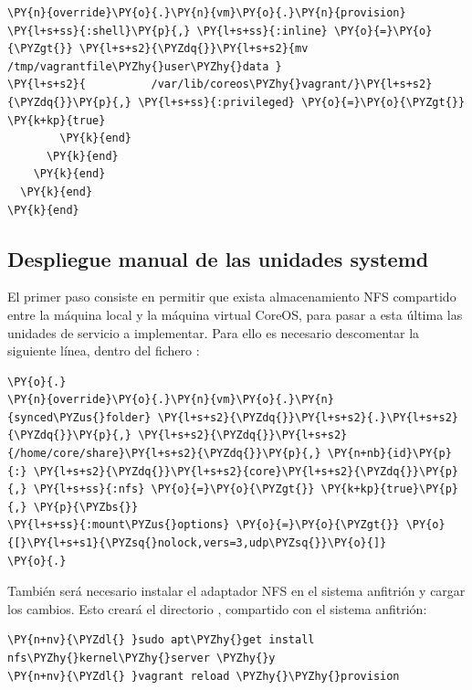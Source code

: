 \begin{codelisting}
\begin{Verbatim}[fontsize=\relsize{-2.5},fontseries=b,commandchars=\\\{\}]
          \PY{n}{override}\PY{o}{.}\PY{n}{vm}\PY{o}{.}\PY{n}{provision} \PY{l+s+ss}{:shell}\PY{p}{,} \PY{l+s+ss}{:inline} \PY{o}{=}\PY{o}{\PYZgt{}} \PY{l+s+s2}{\PYZdq{}}\PY{l+s+s2}{mv /tmp/vagrantfile\PYZhy{}user\PYZhy{}data }
\PY{l+s+s2}{          /var/lib/coreos\PYZhy{}vagrant/}\PY{l+s+s2}{\PYZdq{}}\PY{p}{,} \PY{l+s+ss}{:privileged} \PY{o}{=}\PY{o}{\PYZgt{}} \PY{k+kp}{true}
        \PY{k}{end}
      \PY{k}{end}
    \PY{k}{end}
  \PY{k}{end}
\PY{k}{end}
\end{Verbatim}
\end{codelisting}

\subsection{Despliegue manual de las unidades systemd}

El primer paso consiste en permitir que exista almacenamiento NFS compartido entre la máquina local y la máquina virtual CoreOS, para pasar a esta última las unidades de servicio a implementar. Para ello es necesario descomentar la siguiente línea, dentro del fichero :

\begin{codelisting}
\label{code:vagrantfile2}
\begin{Verbatim}[fontsize=\relsize{-2.5},fontseries=b,commandchars=\\\{\}]
\PY{o}{.}
\PY{n}{override}\PY{o}{.}\PY{n}{vm}\PY{o}{.}\PY{n}{synced\PYZus{}folder} \PY{l+s+s2}{\PYZdq{}}\PY{l+s+s2}{.}\PY{l+s+s2}{\PYZdq{}}\PY{p}{,} \PY{l+s+s2}{\PYZdq{}}\PY{l+s+s2}{/home/core/share}\PY{l+s+s2}{\PYZdq{}}\PY{p}{,} \PY{n+nb}{id}\PY{p}{:} \PY{l+s+s2}{\PYZdq{}}\PY{l+s+s2}{core}\PY{l+s+s2}{\PYZdq{}}\PY{p}{,} \PY{l+s+ss}{:nfs} \PY{o}{=}\PY{o}{\PYZgt{}} \PY{k+kp}{true}\PY{p}{,} \PY{p}{\PYZbs{}}
\PY{l+s+ss}{:mount\PYZus{}options} \PY{o}{=}\PY{o}{\PYZgt{}} \PY{o}{[}\PY{l+s+s1}{\PYZsq{}nolock,vers=3,udp\PYZsq{}}\PY{o}{]}
\PY{o}{.}
\end{Verbatim}
\end{codelisting}

También será necesario instalar el adaptador NFS en el sistema anfitrión y cargar los cambios. Esto creará el directorio , compartido con el sistema anfitrión:

\begin{framed_shaded}
\begin{Verbatim}[fontsize=\relsize{-2.5},fontseries=b,commandchars=\\\{\}]
\PY{n+nv}{\PYZdl{} }sudo apt\PYZhy{}get install nfs\PYZhy{}kernel\PYZhy{}server \PYZhy{}y
\PY{n+nv}{\PYZdl{} }vagrant reload \PYZhy{}\PYZhy{}provision
\end{Verbatim}
\end{framed_shaded}

